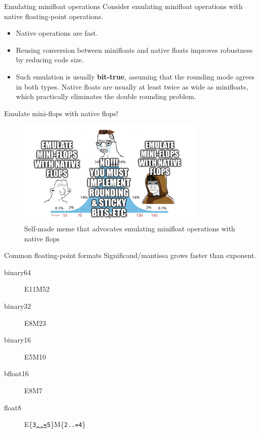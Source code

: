 \documentclass{beamer}
\begin{document}
\begin{frame}{Emulating minifloat operations}
	Consider emulating minifloat operations with native floating-point operations.

	\begin{itemize}
		\item Native operations are fast.
		\item Reusing conversion between minifloats and native floats improves
		      robustness by reducing code size.
		\item Such emulation is usually \textbf{bit-true}, assuming that the
		      rounding mode agrees in both types.  Native floats are usually at
		      least twice as wide as minifloats, which practically eliminates
		      the double rounding problem.
	\end{itemize}
\end{frame}

\begin{frame}{Emulate mini-flops with native flops!}
	\begin{figure}
		\includegraphics[width=0.8\textwidth]{assets/midwit-flops.png}
		\caption{Self-made meme that advocates emulating minifloat operations with native flops}
	\end{figure}
\end{frame}

\begin{frame}{Common floating-point formats}
	Significand/mantissa grows faster than exponent.

	\begin{description}
		\item[binary64] E11M52
		\item[binary32] E8M23
		\item[binary16] E5M10
		\item[bfloat16] E8M7
		\item[float8] E\{\texttt{3\href{https://doc.rust-lang.org/std/ops/struct.RangeInclusive.html}{..=}5}\}M\{\texttt{2..=4}\}
	\end{description}
\end{frame}
\end{document}
